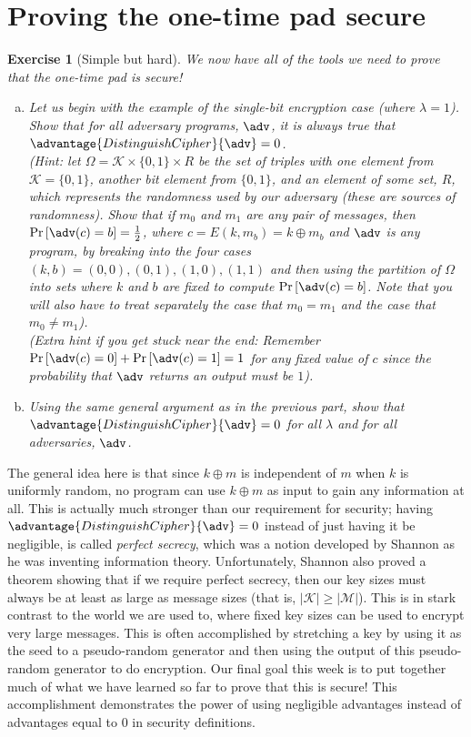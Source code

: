 \documentclass[12pt]{article}
\newcommand{\pr}[1]{\text{Pr}\left[#1\right]}
\newcommand{\verts}[1]{\left\vert #1\right\vert}
\newcommand{\M}{\mathcal{M}}
\newcommand{\K}{\mathcal{K}}
\newtheorem{exercise}{Exercise}
\theoremstyle{definition}
\theoremstyle{remark}
\theoremstyle{definition}
\begin{document}
\section*{Proving the one-time pad secure}

\begin{exercise}[Simple but hard] We now have all of the tools we need to prove that the one-time pad is secure!
\begin{enumerate}[(a)]
\item Let us begin with the example of the single-bit encryption case (where $\lambda = 1$). Show that for all adversary programs, $\adv$, it is always true that $\advantage{DistinguishCipher}{\adv} = 0$.\\
(Hint: let $\Omega = \K\times\{0,1\}\times R$ be the set of triples with one element from $\K = \{0,1\}$, another bit element from $\{0,1\}$, and an element of some set, $R$, which represents the randomness used by our adversary (these are sources of randomness). Show that if $m_0$ and $m_1$ are any pair of messages, then $\pr{\adv(c) = b} = \frac{1}{2}$, where $c = E(k, m_b) = k\oplus m_b$ and $\adv$ is any program, by breaking into the four cases $(k,b) = (0,0), (0, 1), (1, 0), (1, 1)$ and then using the partition of $\Omega$ into sets where $k$ and $b$ are fixed to compute $\pr{\adv(c) = b}$. Note that you will also have to treat separately the case that $m_0=m_1$ and the case that $m_0\neq m_1$).\\
(Extra hint if you get stuck near the end: Remember $\pr{\adv(c) = 0} + \pr{\adv(c) = 1} = 1$ for any fixed value of $c$ since the probability that $\adv$ returns an output must be $1$).
\item Using the same general argument as in the previous part, show that $\advantage{DistinguishCipher}{\adv} = 0$ for all $\lambda$ and for all adversaries, $\adv$.
\end{enumerate}
\end{exercise}

The general idea here is that since $k\oplus m$ is independent of $m$ when $k$ is uniformly random, no program can use $k\oplus m$ as input to gain any information at all. This is actually much stronger than our requirement for security; having $\advantage{DistinguishCipher}{\adv} = 0$ instead of just having it be negligible, is called \emph{perfect secrecy}, which was a notion developed by Shannon as he was inventing information theory. Unfortunately, Shannon also proved a theorem showing that if we require perfect secrecy, then our key sizes must always be at least as large as message sizes (that is, $\verts{\K} \geq \verts{\M}$). This is in stark contrast to the world we are used to, where fixed key sizes can be used to encrypt very large messages. This is often accomplished by stretching a key by using it as the seed to a pseudo-random generator and then using the output of this pseudo-random generator to do encryption. Our final goal this week is to put together much of what we have learned so far to prove that this is secure! This accomplishment demonstrates the power of using negligible advantages instead of advantages equal to $0$ in security definitions.
\end{document}
